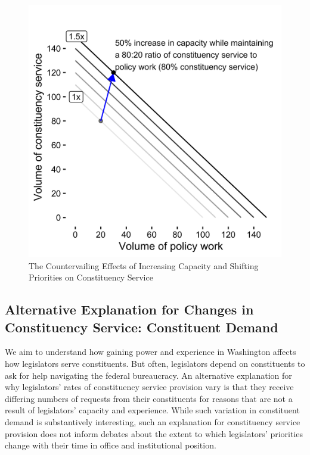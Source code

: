 \documentclass[12pt]{article}
\begin{document}
{\begin{figure}
\centering
\caption{The Countervailing Effects of Increasing Capacity and Shifting Priorities on Constituency Service} \label{f:2x2-fig}
\includegraphics[width = \textwidth]{figs/2x2-fig-1}
\end{figure}






\subsection{Alternative Explanation for Changes in Constituency Service: Constituent Demand}

We aim to understand how gaining power and experience in Washington affects how legislators serve constituents. But often, legislators depend on constituents to ask for help navigating the federal bureaucracy. An alternative explanation for why legislators' rates of constituency service provision vary is that they receive differing numbers of requests from their constituents for reasons that are not a result of legislators' capacity and experience. While such variation in constituent demand is substantively interesting, such an explanation for constituency service provision does not inform debates about the extent to which legislators' priorities change with their time in office and institutional position. 

}
\end{document}
